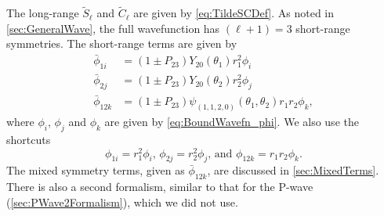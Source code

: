 \documentclass[Dissertation.tex]{subfiles}
\begin{document}
%
%
The long-range $\widetilde{S}_\ell$ and $\widetilde{C}_\ell$ are given by
\cref{eq:TildeSCDef}.
As noted in \cref{sec:GeneralWave}, the full wavefunction has $(\ell+1) = 3$
short-range symmetries. The short-range terms are given by
\begin{subequations}
\label{eq:DWavePhiBar}
\begin{align}
\bar{\phi}_{1i} &= \left(1 \pm P_{23}\right) Y_{20}(\theta_1) r_1^2 \phi_i \label{eq:DWavePhi1i}\\
\bar{\phi}_{2j} &= \left(1 \pm P_{23}\right) Y_{20}(\theta_2) r_2^2 \phi_j \label{eq:DWavePhi2j}\\
\bar{\phi}_{12k} &= \left(1 \pm P_{23}\right) \psi_{(1,1,2,0)}(\theta_1,\theta_2) r_1 r_2 \phi_k, \label{eq:DWavePhi12k}
\end{align}
\end{subequations}
where $\phi_i$, $\phi_j$ and $\phi_k$ are given by \cref{eq:BoundWavefn_phi}.
We also use the shortcuts
\begin{equation}
\label{eq:DWavePhi}
\phi_{1i} = r_1^2 \phi_i \text{, }
\phi_{2j} = r_2^2 \phi_j \text{, and }
\phi_{12k} = r_1 r_2 \phi_k.
\end{equation}
The mixed symmetry terms, given as $\bar{\phi}_{12k}$,
are discussed in \cref{sec:MixedTerms}. There is also a second formalism,
similar to that for the P-wave (\cref{sec:PWave2Formalism}), which we did not
use.%
\end{document}
